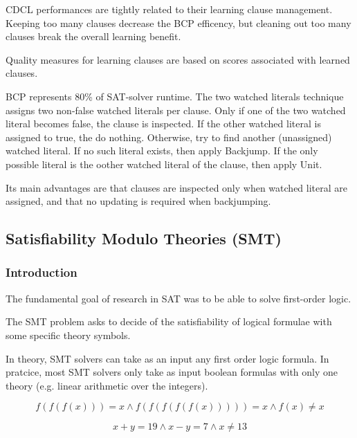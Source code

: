 \documentclass[toc]{../cs-classes/cs-classes}
\begin{document}
CDCL performances are tightly related to their learning clause management. Keeping too many clauses decrease the BCP efficency, but cleaning out too many clauses break the overall learning benefit.

Quality measures for learning clauses are based on scores associated with learned clauses. 

BCP represents 80\% of SAT-solver runtime. The two watched literals technique assigns two non-false watched literals per clause. Only if one of the two watched literal becomes false, the clause is inspected. If the other watched literal is assigned to true, the do nothing. Otherwise, try to find another (unassigned) watched literal. If no such literal exists, then apply Backjump. If the only possible literal is the oother watched literal of the clause, then apply Unit.

Its main advantages are that clauses are inspected only when watched literal are assigned, and that no updating is required when backjumping.

\subsection{Satisfiability Modulo Theories (SMT)}
\subsubsection{Introduction}
The fundamental goal of research in SAT was to be able to solve first-order logic.

The SMT problem asks to decide of the satisfiability of logical formulae with some specific theory symbols. 

In theory, SMT solvers can take as an input any first order logic formula. In pratcice, most SMT solvers only take as input boolean formulas with only one theory (e.g. linear arithmetic over the integers).

\begin{example}
    \begin{equation*}
        f(f(f(x))) = x \land f(f(f(f(f(x))))) = x \land f(x) \neq x
    \end{equation*}

    \begin{equation*}
        x+y = 19 \land x-y=7 \land x\neq 13
    \end{equation*}
\end{example}
\end{document}
